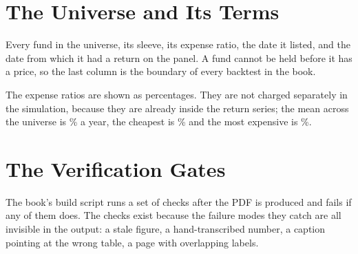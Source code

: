 \chapter{The Universe and Its Terms}
\label{app:universe}

\thispagestyle{plain}

Every fund in the universe, its sleeve, its expense ratio, the date it
listed, and the date from which it had a return on the panel. A fund
cannot be held before it has a price, so the last column is the boundary
of every backtest in the book.

The expense ratios are shown as percentages. They are not charged
separately in the simulation, because they are already inside the return
series; the mean across the universe is \numERMean\% a year, the cheapest
is \numERMin\% and the most expensive is \numERMax\%.

\begingroup
\scriptsize

\endgroup
\clearpage

\chapter{The Verification Gates}
\label{app:gates}

\thispagestyle{plain}

The book's build script runs a set of checks after the PDF is produced and
fails if any of them does. The checks exist because the failure modes they
catch are all invisible in the output: a stale figure, a hand-transcribed
number, a caption pointing at the wrong table, a page with overlapping
labels.

